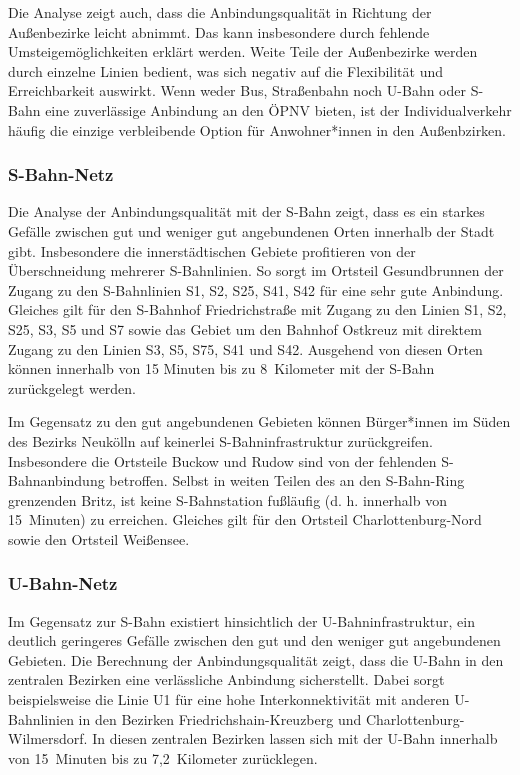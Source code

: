 
Die Analyse zeigt auch, dass die Anbindungsqualität in Richtung der Außenbezirke leicht abnimmt. Das kann insbesondere durch fehlende Umsteigemöglichkeiten erklärt werden. Weite Teile der Außenbezirke werden durch einzelne Linien bedient, was sich negativ auf die Flexibilität und Erreichbarkeit auswirkt. Wenn weder Bus, Straßenbahn noch U-Bahn oder S-Bahn eine zuverlässige Anbindung an den ÖPNV bieten, ist der Individualverkehr häufig die einzige verbleibende Option für Anwohner*innen in den Außenbzirken.

\subsubsection{S-Bahn-Netz}

Die Analyse der Anbindungsqualität mit der S-Bahn zeigt, dass es ein starkes Gefälle zwischen gut und weniger gut angebundenen Orten innerhalb der Stadt gibt. Insbesondere die innerstädtischen Gebiete profitieren von der Überschneidung mehrerer S-Bahnlinien. So sorgt im Ortsteil Gesundbrunnen der Zugang zu den S-Bahnlinien S1, S2, S25, S41, S42 für eine sehr gute Anbindung. Gleiches gilt für den S-Bahnhof Friedrichstraße mit Zugang zu den Linien S1, S2, S25, S3, S5 und S7 sowie das Gebiet um den Bahnhof Ostkreuz mit direktem Zugang zu den Linien S3, S5, S75, S41 und S42. Ausgehend von diesen Orten können innerhalb von 15 Minuten bis zu 8~Kilometer mit der S-Bahn zurückgelegt werden.


Im Gegensatz zu den gut angebundenen Gebieten können Bürger*innen im Süden des Bezirks Neukölln auf keinerlei S-Bahninfrastruktur zurückgreifen. Insbesondere die Ortsteile Buckow und Rudow sind von der fehlenden S-Bahnanbindung betroffen. Selbst in weiten Teilen des an den S-Bahn-Ring grenzenden Britz, ist keine S-Bahnstation fußläufig (d. h. innerhalb von 15~Minuten) zu erreichen. Gleiches gilt für den Ortsteil Charlottenburg-Nord sowie den Ortsteil Weißensee.

\subsubsection{U-Bahn-Netz}

Im Gegensatz zur S-Bahn existiert hinsichtlich der U-Bahninfrastruktur, ein deutlich geringeres Gefälle zwischen den gut und den weniger gut angebundenen Gebieten. Die Berechnung der Anbindungsqualität zeigt, dass die U-Bahn in den zentralen Bezirken eine verlässliche Anbindung sicherstellt. Dabei sorgt beispielsweise die Linie U1 für eine hohe Interkonnektivität mit anderen U-Bahnlinien in den Bezirken Friedrichshain-Kreuzberg und Charlottenburg-Wilmersdorf. In diesen zentralen Bezirken lassen sich mit der U-Bahn innerhalb von 15~Minuten bis zu 7,2~Kilometer zurücklegen.

